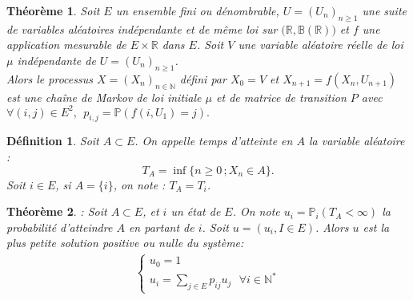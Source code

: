 \documentclass[12pt,a4paper]{report}
\newtheorem{thm}{Théorème}[section]
\newtheorem{definition}{Définition}[section]
\theoremstyle{remark}
\begin{document}
\begin{thm}\label{th1}
Soit $E$ un ensemble fini ou dénombrable, $U = (U_n)_{n\geq1}$ une suite de variables aléatoires indépendante et de même loi sur $(\mathbb{R},\mathbb{B(R))}$ et $f$ une application mesurable de $E \times \mathbb{R}$ dans $E$. Soit $V$ une variable aléatoire réelle de loi $\mu$ indépendante de
$U = (U_n)_{n\geq1}$.\\
Alors le processus $X = (X_n)_{n\in \mathbb{N}}$ défini par $X_0=V$ et $X_{n+1}=f(X_{n},U_{n+1})$ est une chaîne de Markov de loi initiale $\mu$ et de matrice de transition $P$ avec $ \forall (i,j) \in E^2, \ \  p_{i,j}=\mathbb{P}(f(i,U_{1})=j).$
\end{thm}

\begin{definition}\label{def1}
Soit $A \subset E$. On appelle temps d'atteinte en $A$ la variable aléatoire : $$T_A = \inf\{{n\geqslant 0} \, ; X_n \in A\}.$$
Soit $i \in E$, si $A = \{i\}$, on note : $T_A = T_i$.
\end{definition}

\begin{thm}\label{th2}: Soit $A \subset E$, et $i$ un état de $E$. On note $u_i=\mathbb{P}_i(T_A <\infty)$ la probabilité d'atteindre $A$ en partant de $i$. Soit $u = (u_i , I \in E)$. Alors $u$ est la plus petite solution positive ou nulle du système:
\begin{align*}
 \left\{
\begin{array}{ll}
        u_0=1\\
        u_i= \sum\limits_{j\in E} p_{ij}u_j \ \ \ \forall i \in \mathbb{N}^*
    \end{array}
\right.
\end{align*}
\end{thm}
\end{document}
